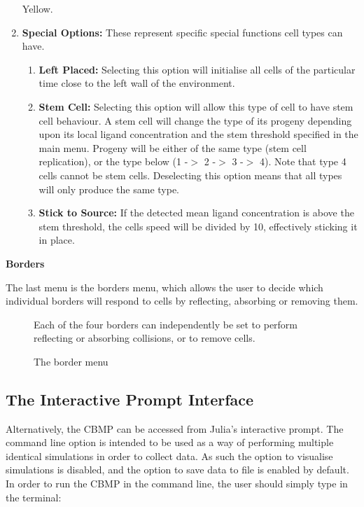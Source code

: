 \documentclass[11.5pt]{article}
\begin{document}
\begin{enumerate}
Yellow.
\item {\bfseries Special Options: }These represent specific special 
functions cell types can have.
\begin{enumerate}
\item {\bfseries Left Placed: }Selecting this option will initialise all 
cells of the particular time close to the left wall of the environment.
\item {\bfseries Stem Cell: }Selecting this option will allow this type 
of cell to have stem cell behaviour. A stem cell will change the type of 
its progeny depending upon its local ligand concentration and the stem 
threshold specified in the main menu. Progeny will be either of the same 
type (stem cell replication), or the type below (1 -$>$ 2 -$>$ 3 -$>$ 
4). Note that type 4 cells cannot be stem cells. Deselecting this option 
means that all types will only produce the same type.
\item {\bfseries Stick to Source: }If the detected mean ligand 
concentration is above the stem threshold, the cells speed will be 
divided by 10, effectively sticking it in place. 
\setcounter{numberedCntE}{\theenumi}
\end{enumerate}
\end{enumerate}


{\bfseries Borders}

The last menu is the borders menu, which allows the user to decide which 
individual borders will respond to cells by reflecting, absorbing or 
removing them.

\begin{figure}[H]
\centering
\caption{The border menu}Each of the four 
borders can independently be set to perform reflecting or absorbing 
collisions, or to remove cells.
\end{figure}

\subsection{The Interactive Prompt 
Interface}
Alternatively, the CBMP can be accessed from Julia's interactive prompt. 
The command line option is intended to be used as a way of performing 
multiple identical simulations in order to collect data. As such the 
option to visualise simulations is disabled, and the option to save data 
to file is enabled by default. In order to run the CBMP in the command 
line, the user should simply type in the terminal:
\end{document}
